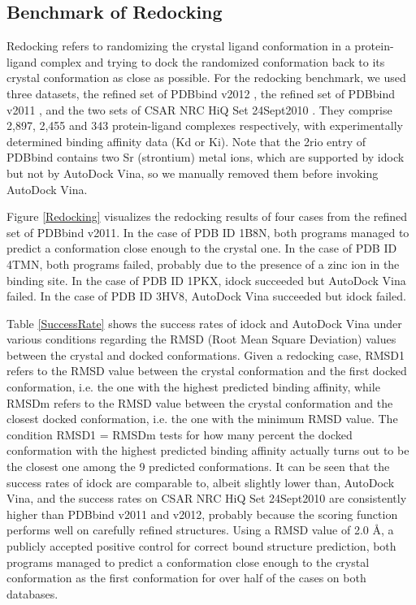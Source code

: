 \documentclass[12pt]{article}
\begin{document}
\subsection*{\sffamily \large Benchmark of Redocking}

Redocking refers to randomizing the crystal ligand conformation in a protein-ligand complex and trying to dock the randomized conformation back to its crystal conformation as close as possible. For the redocking benchmark, we used three datasets, the refined set of PDBbind v2012 \citep{529,530}, the refined set of PDBbind v2011 \citep{529,530}, and the two sets of CSAR NRC HiQ Set 24Sept2010 \citep{857,960}. They comprise 2,897, 2,455 and 343 protein-ligand complexes respectively, with experimentally determined binding affinity data (Kd or Ki). Note that the 2rio entry of PDBbind contains two Sr (strontium) metal ions, which are supported by idock but not by AutoDock Vina, so we manually removed them before invoking AutoDock Vina.

Figure \ref{Redocking} visualizes the redocking results of four cases from the refined set of PDBbind v2011. In the case of PDB ID 1B8N, both programs managed to predict a conformation close enough to the crystal one. In the case of PDB ID 4TMN, both programs failed, probably due to the presence of a zinc ion in the binding site. In the case of PDB ID 1PKX, idock succeeded but AutoDock Vina failed. In the case of PDB ID 3HV8, AutoDock Vina succeeded but idock failed.

Table \ref{SuccessRate} shows the success rates of idock and AutoDock Vina under various conditions regarding the RMSD (Root Mean Square Deviation) values between the crystal and docked conformations. Given a redocking case, RMSD1 refers to the RMSD value between the crystal conformation and the first docked conformation, i.e. the one with the highest predicted binding affinity, while RMSDm refers to the RMSD value between the crystal conformation and the closest docked conformation, i.e. the one with the minimum RMSD value. The condition RMSD1 = RMSDm tests for how many percent the docked conformation with the highest predicted binding affinity actually turns out to be the closest one among the 9 predicted conformations. It can be seen that the success rates of idock are comparable to, albeit slightly lower than, AutoDock Vina, and the success rates on CSAR NRC HiQ Set 24Sept2010 are consistently higher than PDBbind v2011 and v2012, probably because the scoring function performs well on carefully refined structures. Using a RMSD value of 2.0 \AA, a publicly accepted positive control for correct bound structure prediction, both programs managed to predict a conformation close enough to the crystal conformation as the first conformation for over half of the cases on both databases.
\end{document}
